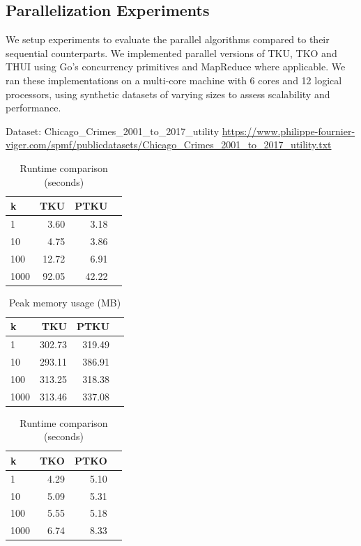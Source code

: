\subsection{Parallelization Experiments}
We setup experiments to evaluate the parallel algorithms compared to their sequential counterparts. We implemented parallel versions of TKU, TKO and THUI using Go's concurrency primitives and MapReduce where applicable. We ran these implementations on a multi-core machine with 6 cores and 12 logical processors, using synthetic datasets of varying sizes to assess scalability and performance.


Dataset: Chicago\_Crimes\_2001\_to\_2017\_utility
\url{https://www.philippe-fournier-viger.com/spmf/publicdatasets/Chicago_Crimes_2001_to_2017_utility.txt}

\begin{table}[H]
\caption{Runtime comparison (seconds)}\label{tab:runtime}
\centering
\begin{tabular}{@{}lrrr@{}}
\toprule
\textbf{k} & \textbf{TKU} & \textbf{PTKU} \\
\midrule
1 & 3.60 & 3.18  \\
10 & 4.75 & 3.86  \\
100 & 12.72 & 6.91 \\
1000 & 92.05 & 42.22 \\
\bottomrule
\end{tabular}
\end{table}

\begin{table}[H]
\caption{Peak memory usage (MB)}\label{tab:memory}
\centering
\begin{tabular}{@{}lrrr@{}}
\toprule
\textbf{k} & \textbf{TKU} & \textbf{PTKU} \\
\midrule
1 & 302.73 & 319.49  \\
10 & 293.11 & 386.91  \\
100 & 313.25 & 318.38 \\
1000 & 313.46 & 337.08 \\

\bottomrule
\end{tabular}
\end{table}

\begin{table}[H]
\caption{Runtime comparison (seconds)}\label{tab:runtime}
\centering
\begin{tabular}{@{}lrrr@{}}
\toprule
\textbf{k} & \textbf{TKO} & \textbf{PTKO} \\
\midrule
1 & 4.29 & 5.10 \\
10 & 5.09 & 5.31 \\
100 & 5.55 & 5.18 \\
1000 & 6.74 & 8.33 \\
\bottomrule
\end{tabular}
\end{table}

